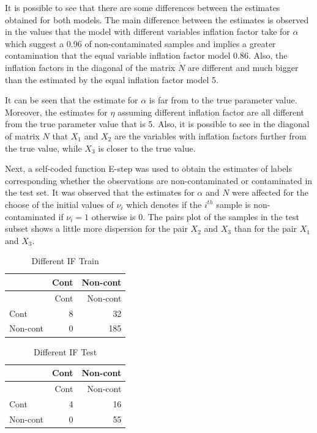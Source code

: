 \documentclass[
]{article}
\begin{document}
It is possible to see that there are some differences between the
estimates obtained for both models. The main difference between the
estimates is observed in the values that the model with different
variables inflation factor take for \(\alpha\) which suggest a 0.96 of
non-contaminated samples and implies a greater contamination that the
equal variable inflation factor model 0.86. Also, the inflation factors
in the diagonal of the matrix \(\dot{N}\) are different and much bigger
than the estimated by the equal inflation factor model 5.

It can be seen that the estimate for \(\alpha\) is far from to the true
parameter value. Moreover, the estimates for \(\eta\) assuming different
inflation factor are all different from the true parameter value that is
5. Also, it is possible to see in the diagonal of matrix \(N\) that
\(X_{1}\) and \(X_{2}\) are the variables with inflation factors further
from the true value, while \(X_{3}\) is closer to the true value.

Next, a self-coded function E-step was used to obtain the estimates of
labels corresponding whether the observations are non-contaminated or
contaminated in the test set. It was observed that the estimates for
\(\alpha\) and \(N\) were affected for the choose of the initial values
of \(\nu_{i}\) which denotes if the \(i^{th}\) sample is
non-contaminated if \(\nu_{i}=1\) otherwise is \(0\). The pairs plot of
the samples in the test subset shows a little more dispersion for the
pair \(X_{2}\) and \(X_{3}\) than for the pair \(X_{1}\) and \(X_{3}\).

\begin{longtable}[]{@{}lrr@{}}
\caption{Different IF Train}\tabularnewline
\toprule\noalign{}
& Cont & Non-cont \\
\midrule\noalign{}
\endfirsthead
\toprule\noalign{}
& Cont & Non-cont \\
\midrule\noalign{}
\endhead
\bottomrule\noalign{}
\endlastfoot
Cont & 8 & 32 \\
Non-cont & 0 & 185 \\
\end{longtable}

\begin{longtable}[]{@{}lrr@{}}
\caption{Different IF Test}\tabularnewline
\toprule\noalign{}
& Cont & Non-cont \\
\midrule\noalign{}
\endfirsthead
\toprule\noalign{}
& Cont & Non-cont \\
\midrule\noalign{}
\endhead
\bottomrule\noalign{}
\endlastfoot
Cont & 4 & 16 \\
Non-cont & 0 & 55 \\
\end{longtable}
\end{document}
